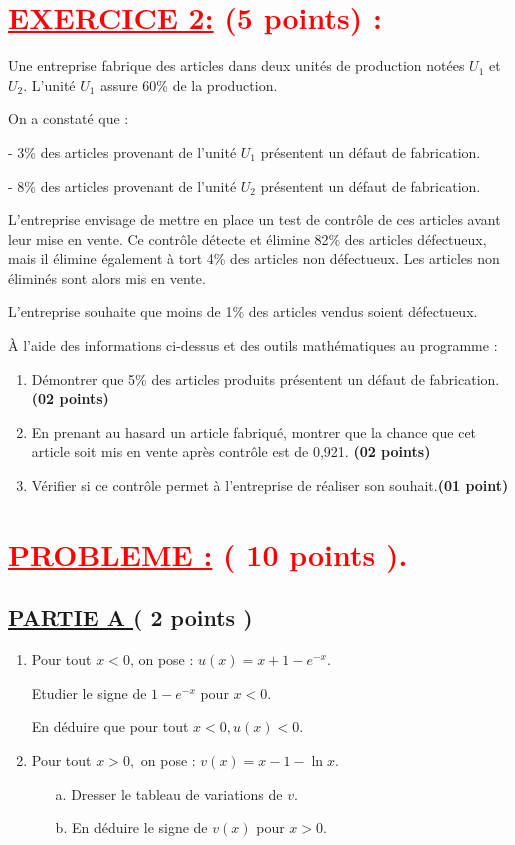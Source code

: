 \documentclass[12pt]{article}
\begin{document}
\section*{\textcolor{red}{\underline{EXERCICE 2:} (5 points) :}}

Une entreprise fabrique des articles dans deux unités de production notées \( U_1 \) et \( U_2 \). L’unité \( U_1 \) assure 60\% de la production.

On a constaté que :

- 3\% des articles provenant de l’unité \( U_1 \) présentent un défaut de fabrication.

- 8\% des articles provenant de l’unité \( U_2 \) présentent un défaut de fabrication.

L’entreprise envisage de mettre en place un test de contrôle de ces articles avant leur mise en vente. Ce contrôle détecte et élimine 82\% des articles défectueux, mais il élimine également à tort 4\% des articles non défectueux. Les articles non éliminés sont alors mis en vente.

L’entreprise souhaite que moins de 1\% des articles vendus soient défectueux.

À l’aide des informations ci-dessus et des outils mathématiques au programme :
\begin{enumerate}
    \item Démontrer que 5\% des articles produits présentent un défaut de fabrication. \textbf{(02 points)}
    \item En prenant au hasard un article fabriqué, montrer que la chance que cet article soit mis en vente après contrôle est de 0,921. \textbf{(02 points)}
    \item Vérifier si ce contrôle permet à l’entreprise de réaliser son souhait.\hfill \textbf{(01 point)}
\end{enumerate}
\section*{\textcolor{red}{\underline{PROBLEME :} ( 10 points ).}}
\subsection*{ \underline{PARTIE A } ( 2 points ) }
\begin{enumerate}
\item Pour tout $x < 0$, on pose : $u(x)=x+1-e^{-x}$.

Etudier le signe de $1-e^{-x}$ pour $x < 0$.

En déduire que pour tout $x < 0, u(x) < 0 $.

\item Pour tout $x > 0,$ on pose : $v(x)=x-1-\ln x$.
\begin{enumerate}
\item[a.] Dresser le tableau de variations de $v$.
\item[b.] En déduire le signe de $v(x)$ pour $x > 0 $.
\end{enumerate}
\end{enumerate}
\end{document}
